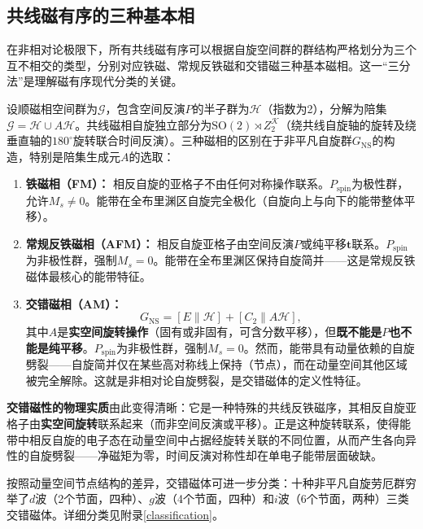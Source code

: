 \subsection{共线磁有序的三种基本相}

在非相对论极限下，所有共线磁有序可以根据自旋空间群的群结构严格划分为三个互不相交的类型，分别对应铁磁、常规反铁磁和交错磁三种基本磁相\cite{Smejkal2022PRX,liu_symmetry_2026,jungwirth_symmetry_2026}。这一“三分法”是理解磁有序现代分类的关键。

设顺磁相空间群为$\mathcal{G}$，包含空间反演$P$的半子群为$\mathcal{H}$（指数为2），分解为陪集$\mathcal{G} = \mathcal{H} \cup A\mathcal{H}$。共线磁相自旋独立部分为$\mathrm{SO}(2) \rtimes Z_2^{\mathcal{K}}$（绕共线自旋轴的旋转及绕垂直轴的$180^\circ$旋转联合时间反演）。三种磁相的区别在于非平凡自旋群$G_{\mathrm{NS}}$的构造，特别是陪集生成元$A$的选取\cite{Smejkal2022PRX}：

\begin{enumerate}
\item \textbf{铁磁相（FM）：} 相反自旋的亚格子不由任何对称操作联系。$P_{\mathrm{spin}}$为极性群，允许$M_s\neq0$。能带在全布里渊区自旋完全极化（自旋向上与向下的能带整体平移）。

\item \textbf{常规反铁磁相（AFM）：} 相反自旋亚格子由空间反演$P$或纯平移$\mathbf{t}$联系。$P_{\mathrm{spin}}$为非极性群，强制$M_s=0$。能带在全布里渊区保持自旋简并——这是常规反铁磁体最核心的能带特征。

\item \textbf{交错磁相（AM）：} 
\begin{equation}
G_{\mathrm{NS}} = [E\|\mathcal{H}] + [C_2\|A\mathcal{H}],
\label{eq:altermag_SSG}
\end{equation}
其中$A$是\textbf{实空间旋转操作}（固有或非固有，可含分数平移），但\textbf{既不能是$P$也不能是纯平移}\cite{Smejkal2022PRX,jungwirth_symmetry_2026}。$P_{\mathrm{spin}}$为非极性群，强制$M_s=0$。然而，能带具有动量依赖的自旋劈裂——自旋简并仅在某些高对称线上保持（节点），而在动量空间其他区域被完全解除。这就是非相对论自旋劈裂，是交错磁体的定义性特征。
\end{enumerate}

\textbf{交错磁性的物理实质}由此变得清晰：它是一种特殊的共线反铁磁序，其相反自旋亚格子由\textbf{实空间旋转}联系起来（而非空间反演或平移）。正是这种旋转联系，使得能带中相反自旋的电子态在动量空间中占据经旋转关联的不同位置，从而产生各向异性的自旋劈裂——净磁矩为零，时间反演对称性却在单电子能带层面破缺。

按照动量空间节点结构的差异，交错磁体可进一步分类：十种非平凡自旋劳厄群穷举了$d$波（2个节面，四种）、$g$波（4个节面，四种）和$i$波（6个节面，两种）三类交错磁体\cite{jungwirth_symmetry_2026}。详细分类见附录\autoref{classification}。
